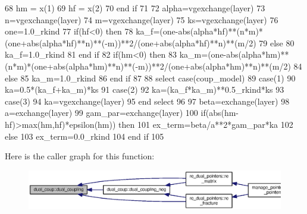 \begin{DoxyCode}
68            hm = x(1)
69            hf = x(2)
70 \textcolor{keywordflow}{     end if}
71      
72      alpha=vgexchange(layer)%
73      n=vgexchange(layer)%
74      m=vgexchange(layer)%
75      ks=vgexchange(layer)%
76      one=1.0\_rkind   
77      \textcolor{keywordflow}{if}(hf<0) \textcolor{keywordflow}{then}
78        ka\_f=(one-abs(alpha*hf)**(n*m)*(one+abs(alpha*hf)**n)**(-m))**2/(one\textcolor{comment}{+abs(alpha*hf)**n)**(m/2)}
79 \textcolor{comment}{     }\textcolor{keywordflow}{else}
80        ka\_f=1.0\_rkind
81 \textcolor{keywordflow}{     end if}
82      \textcolor{keywordflow}{if}(hm<0) \textcolor{keywordflow}{then}
83        ka\_m=(one-abs(alpha*hm)**(n*m)*(one+abs(alpha*hm)**n)**(-m))**2/(one\textcolor{comment}{+abs(alpha*hm)**n)**(m/2)}
84 \textcolor{comment}{     }\textcolor{keywordflow}{else}
85        ka\_m=1.0\_rkind
86 \textcolor{keywordflow}{     end if}  
87 
88      \textcolor{keywordflow}{select case}(coup_model)
89            \textcolor{keywordflow}{case}(1)
90          ka=0.5*(ka\_f+ka\_m)*ks
91        \textcolor{keywordflow}{case}(2)
92          ka=(ka\_f*ka\_m)**0.5\_rkind*ks
93        \textcolor{keywordflow}{case}(3)
94          ka=vgexchange(layer)%
95 \textcolor{keywordflow}{    end select}
96     
97      beta=exchange(layer)%
98      a=exchange(layer)%
99      gam\_par=exchange(layer)%
100      \textcolor{keywordflow}{if}(abs(hm-hf)>max(hm,hf)*epsilon(hm)) \textcolor{keywordflow}{then}
101        ex\_term=beta/a**2*gam\_par*ka
102      \textcolor{keywordflow}{else}
103        ex\_term=0.0\_rkind
104 \textcolor{keywordflow}{     end if}
105 
\end{DoxyCode}


Here is the caller graph for this function\+:\nopagebreak
\begin{figure}[H]
\begin{center}
\leavevmode
\includegraphics[width=350pt]{namespacedual__coup_a45c1c65b71e8f97db4a84a2a775b90e5_icgraph}
\end{center}
\end{figure}


